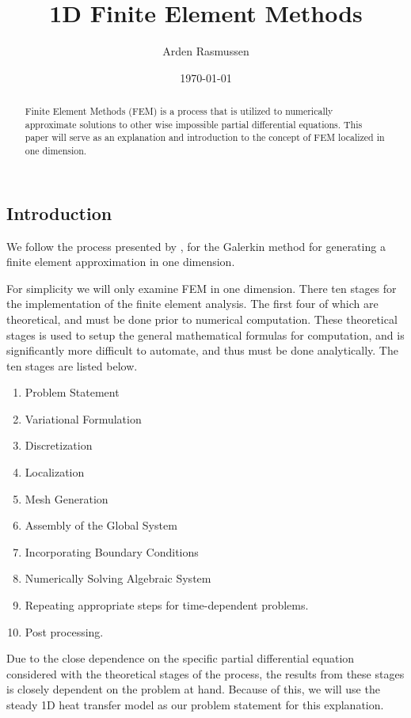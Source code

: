 \documentclass[10pt]{amsart}
\title{1D Finite Element Methods}
\author{Arden Rasmussen}
\date{\today}
\numberwithin{equation}{section}
\theoremstyle{definition}
\begin{document}
\maketitle
\begin{abstract}
  Finite Element Methods (FEM) is a process that is utilized to numerically
  approximate solutions to other wise impossible partial differential equations.
  This paper will serve as an explanation and introduction to the concept of
  FEM localized in one dimension.
\end{abstract}

\begin{multicols}{2}

  \section{Introduction}%
  \label{sec:introduction}

  We follow the process presented by \cite{KH}, for the Galerkin method for
  generating a finite element approximation in one dimension.

  For simplicity we will only examine FEM in one dimension. There ten stages for
  the implementation of the finite element analysis. The first four of which are
  theoretical, and must be done prior to numerical computation. These theoretical
  stages is used to setup the general mathematical formulas for computation, and
  is significantly more difficult to automate, and thus must be done
  analytically. The ten stages are listed below.

  \begin{enumerate}[label=(\roman*)]
    \item Problem Statement
    \item Variational Formulation
    \item Discretization
    \item Localization
    \item Mesh Generation
    \item Assembly of the Global System
    \item Incorporating Boundary Conditions
    \item Numerically Solving Algebraic System
    \item Repeating appropriate steps for time-dependent problems.
    \item Post processing.
  \end{enumerate}

  Due to the close dependence on the specific partial differential equation
  considered with the theoretical stages of the process, the results from these
  stages is closely dependent on the problem at hand. Because of this, we will use
  the steady 1D heat transfer model as our problem statement for this
  explanation.


\end{multicols}
\end{document}
